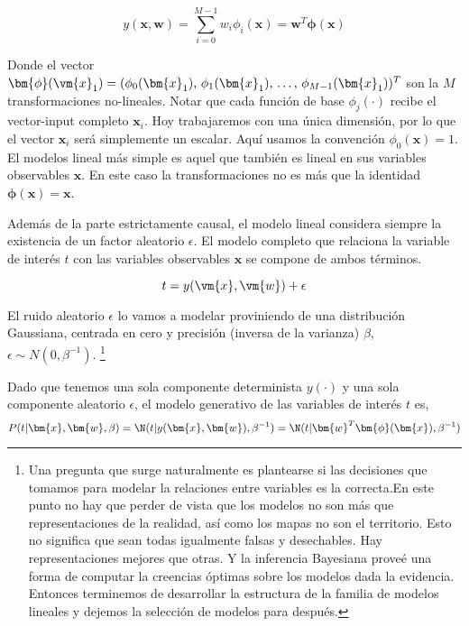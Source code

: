 \begin{equation}
y(\bm{x},\bm{w}) = \sum_{i=0}^{M-1} w_i \phi_i(\bm{x}) = \bm{w}^T \bm{\phi}(\bm{x})
\end{equation}
 
Donde el vector $\bm{\phi}(\vm{x}_1) = ( \phi_0(\bm{x}_1), \, \phi_1(\bm{x}_1) , \, \dots , \, \phi_{M-1}(\bm{x}_1) )^T$ son la $M$ transformaciones no-lineales.
Notar que cada funci\'on de base $\phi_j(\cdot)$ recibe el vector-input completo $\bm{x}_i$.
Hoy trabajaremos con una \'unica dimensi\'on, por lo que el vector $\bm{x}_i$ ser\'a simplemente un escalar.
Aqu\'i usamos la convenci\'on $\phi_0(\bm{x})=1$.
El modelos lineal m\'as simple es aquel que tambi\'en es lineal en sus variables observables $\bm{x}$.
En este caso la transformaciones no es m\'as que la identidad $\bm{\phi}(\bm{x})=\bm{x}$.

Adem\'as de la parte estrictamente causal, el modelo lineal considera siempre la existencia de un factor aleatorio $\epsilon$.
El modelo completo que relaciona la variable de inter\'es $t$ con las variables observables $\bm{x}$ se compone de ambos t\'erminos.

\begin{equation}
 t = y(\vm{x},\vm{w}) + \epsilon
\end{equation}
 
El ruido aleatorio $\epsilon$ lo vamos a modelar proviniendo de una distribuci\'on Gaussiana, centrada en cero y precisi\'on (inversa de la varianza) $\beta$, $\epsilon \sim N(0,\beta^{-1})$.
\footnote{Una pregunta que surge naturalmente es plantearse si las decisiones que tomamos para modelar la relaciones entre variables es la correcta.En este punto no hay que perder de vista que los modelos no son m\'as que representaciones de la realidad, as\'i como los mapas no son el territorio.
Esto no significa que sean todas igualmente falsas y desechables.
Hay representaciones mejores que otras.
Y la inferencia Bayesiana prove\'e una forma de computar la creencias \'optimas sobre los modelos dada la evidencia.
Entonces terminemos de desarrollar la estructura de la familia de modelos lineales y dejemos la selecci\'on de modelos para despu\'es.}

Dado que tenemos una sola componente determinista $y(\cdot)$ y una sola componente aleatorio $\epsilon$, el modelo generativo de las variables de inter\'es $t$ es,
\begin{equation}
P(t | \bm{x}, \bm{w}, \beta) = \N(t | y(\bm{x},\bm{w}), \beta^{-1}) = \N(t | \bm{w}^T \bm{\phi}(\bm{x}) , \beta^{-1})
\end{equation}

